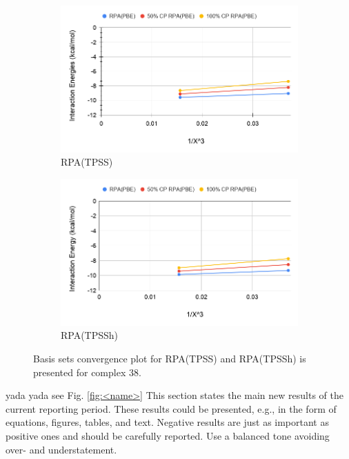 \documentclass[11pt]{article}
\newcommand{\brian}[1]{{\color{orange} #1}}
\begin{document}
\begin{figure}[hbpt]
  \centering
  \begin{subfigure}{.5\textwidth}
    \center
    \includegraphics[scale=0.3]{tpss_38.png}
    \caption{RPA(TPSS)}
    \label{fig:tpss_38}
  \end{subfigure}%
  \begin{subfigure}{.5\textwidth}
    \center
    \includegraphics[scale=0.3]{tpssh_38.png}
    \caption{RPA(TPSSh)}
    \label{fig:tpssh_38}
  \end{subfigure}
  \caption{Basis sets convergence plot for RPA(TPSS) and RPA(TPSSh) is
    presented for complex 38.}
  \label{fig:complex_38}
\end{figure}



\brian{yada yada see Fig. \ref{fig:<name>}}
This section states the main new results of the current
reporting period. These results could be presented, e.g., in the form of
equations, figures, tables, and text. Negative results are just as
important as positive ones and should be carefully reported. Use a
balanced tone avoiding over- and understatement. 
\end{document}
